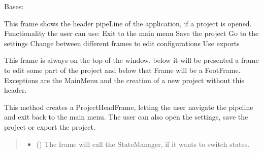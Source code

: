 \documentclass[letterpaper,10pt,english]{sphinxmanual}
\begin{document}
\begin{fulllineitems}
\label{\detokenize{apidoc/src.osm_configurator.view.toplevelframes:src.osm_configurator.view.toplevelframes.project_head_frame.ProjectHeadFrame}}
\pysigstartsignatures
{}
\pysigstopsignatures
\sphinxAtStartPar
Bases: {\hyperref[\detokenize{apidoc/src.osm_configurator.view.toplevelframes:src.osm_configurator.view.toplevelframes.top_level_frame.TopLevelFrame}]{}}

\sphinxAtStartPar
This frame shows the header pipeLine of the application, if a project is opened.
Functionality the user can use:
\sphinxhyphen{} Exit to the main menu
\sphinxhyphen{} Save the project
\sphinxhyphen{} Go to the settings
\sphinxhyphen{} Change between different frames to edit configurations
\sphinxhyphen{} Use exports

\sphinxAtStartPar
This frame is always on the top of the window. below it will be presented a frame to edit some part of the project
and below that Frame will be a FootFrame.
Exceptions are the MainMenu and the creation of a new project without this header.

\begin{fulllineitems}
\label{\detokenize{apidoc/src.osm_configurator.view.toplevelframes:src.osm_configurator.view.toplevelframes.project_head_frame.ProjectHeadFrame.__init__}}
\pysigstartsignatures
{}
\pysigstopsignatures
\sphinxAtStartPar
This method creates a ProjectHeadFrame, letting the user navigate the pipeline and exit back to the main menu.
The user can also open the settings, save the project or export the project.
\begin{quote}\begin{description}
\begin{itemize}
\item {} 
\sphinxAtStartPar
{} ({\hyperref[\detokenize{apidoc/src.osm_configurator.view.states:src.osm_configurator.view.states.state_manager.StateManager}]{}}) \textendash{} The frame will call the StateManager, if it wants to switch states.


\end{itemize}
\end{description}
\end{quote}
\end{fulllineitems}
\end{fulllineitems}
\end{document}
